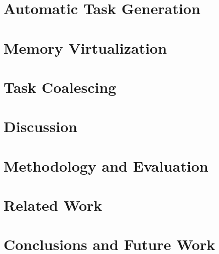 \documentclass[pageno]{jpaper}
\begin{document}


\section{Automatic Task Generation}
\label{sec:compiler}



\section{Memory Virtualization}
\label{sec:memory_virtulaization}



\section{Task Coalescing}
\label{sec:task_coalescing}



\section{Discussion}
\label{sec:discussion}



\section{Methodology and Evaluation}
\label{sec:methodology_evaluation}



\section{Related Work}
\label{sec:related_work}



\section{Conclusions and Future Work}
\label{sec:conclusions}



\newpage





\end{document}
